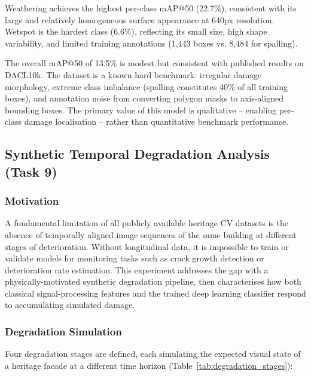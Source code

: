 \documentclass[12pt,a4paper]{article}
\begin{document}
Weathering achieves the highest per-class mAP@50 (22.7\%), consistent with its large and relatively homogeneous surface appearance at 640px resolution. Wetspot is the hardest class (6.6\%), reflecting its small size, high shape variability, and limited training annotations (1,443 boxes vs. 8,484 for spalling).

The overall mAP@50 of 13.5\% is modest but consistent with published results on DACL10k. The dataset is a known hard benchmark: irregular damage morphology, extreme class imbalance (spalling constitutes 40\% of all training boxes), and annotation noise from converting polygon masks to axis-aligned bounding boxes. The primary value of this model is qualitative -- enabling per-class damage localisation -- rather than quantitative benchmark performance.

\subsection{Synthetic Temporal Degradation Analysis (Task 9)}

\subsubsection{Motivation}

A fundamental limitation of all publicly available heritage CV datasets is the absence of temporally aligned image sequences of the same building at different stages of deterioration. Without longitudinal data, it is impossible to train or validate models for monitoring tasks such as crack growth detection or deterioration rate estimation. This experiment addresses the gap with a physically-motivated synthetic degradation pipeline, then characterises how both classical signal-processing features and the trained deep learning classifier respond to accumulating simulated damage.

\subsubsection{Degradation Simulation}

Four degradation stages are defined, each simulating the expected visual state of a heritage facade at a different time horizon (Table~\ref{tab:degradation_stages}):
\end{document}
